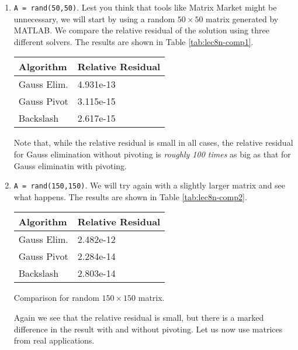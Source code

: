 \begin{enumerate}
\item \lstinline[style=myMatlab]{A = rand(50,50)}.  Lest you think that tools like Matrix Market might be unnecessary, we will start by using a random $50 \times 50$ matrix generated by MATLAB.  We compare the relative residual of the solution using three different solvers.  The results are shown in Table \ref{tab:lec8n-comp1}.
\begin{margintable}
\begin{tabular}{|l | l |}
\hline
\textbf{Algorithm} & \textbf{Relative Residual} \\ \hline
Gauss Elim. & 4.931e-13 \\ \hline
Gauss Pivot & 3.115e-15 \\ \hline
Backslash & 2.617e-15 \\ \hline
\end{tabular}
\caption{Comparison for random $50 \times 50$ matrix.}
\label{tab:lec8n-comp1}
\end{margintable} 
Note that, while the relative residual is small in all cases, the relative residual for Gauss elimination without pivoting is \emph{roughly 100 times} as big as that for Gauss eliminatin with pivoting.

\item \lstinline[style=myMatlab]{A = rand(150,150)}.  We will try again with a slightly larger matrix and see what happens.  The results are shown in Table \ref{tab:lec8n-comp2}.
\begin{margintable}
\begin{tabular}{|l | l |}
\hline
\textbf{Algorithm} & \textbf{Relative Residual} \\ \hline
Gauss Elim. & 2.482e-12 \\ \hline
Gauss Pivot & 2.284e-14 \\ \hline
Backslash & 2.803e-14 \\ \hline
\end{tabular}
\caption{Comparison for random $150 \times 150$ matrix.}
\label{tab:lec8n-comp2}
\end{margintable}
Again we see that the relative residual is small, but there is a marked difference in the result with and without pivoting. Let us now use matrices from real applications.


\end{enumerate}
